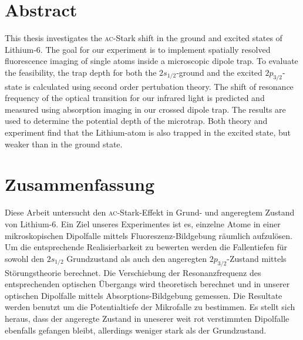 \section*{Abstract}

This thesis investigates the \textsc{ac}-Stark shift in the ground and excited states of Lithium-6. 
The goal for our experiment is to implement spatially resolved fluorescence imaging of single atoms inside a microscopic dipole trap. To evaluate the feasibility, the trap depth for both the $2s_{1/2}$-ground and the excited $2p_{3/2}$-state is calculated using second order pertubation theory. The shift of resonance frequency of the optical transition for our infrared light is predicted and measured using absorption imaging in our crossed dipole trap. The results are used to determine the potential depth of the microtrap. Both theory and experiment find that the Lithium-atom is also trapped in the excited state, but weaker than in the ground state.

\section*{Zusammenfassung}

Diese Arbeit untersucht den \textsc{ac}-Stark-Effekt in Grund- und angeregtem Zustand von Lithium-6. Ein Ziel unseres Experimentes ist es, einzelne Atome in einer mikroskopischen Dipolfalle mittels Fluoreszenz-Bildgebung räumlich aufzulösen. Um die entsprechende Realisierbarkeit zu bewerten werden die Fallentiefen für sowohl den $2s_{1/2}$ Grundzustand als auch den angeregten $2p_{3/2}$-Zustand mittels Störungstheorie berechnet. Die Verschiebung der Resonanzfrequenz des entsprechenden optischen Übergangs wird theoretisch berechnet und in unserer optischen Dipolfalle mittels Absorptions-Bildgebung gemessen. Die Resultate werden benutzt um die Potentialtiefe der Mikrofalle zu bestimmen. Es stellt sich heraus, dass der angeregte Zustand in uneserer weit rot verstimmten Dipolfalle ebenfalls gefangen bleibt, allerdings weniger stark als der Grundzustand.